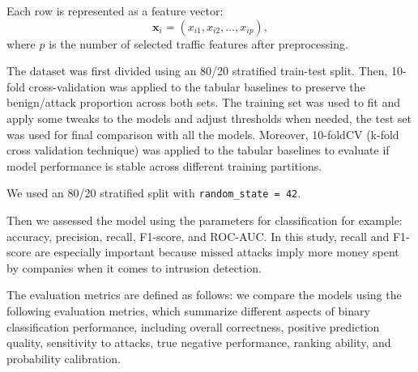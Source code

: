 \documentclass[final,5p,times,twocolumn]{elsarticle}
\begin{document}
Each row is represented as a feature vector:
\[
\mathbf{x}_i = (x_{i1}, x_{i2}, \ldots, x_{ip}),
\]
where $p$ is the number of selected traffic features after preprocessing.

The dataset was first divided using an 80/20 stratified train-test split. Then, 10-fold cross-validation was applied to the tabular baselines to preserve the benign/attack proportion across both sets. The training set was used to fit and apply some tweaks to the models and adjust thresholds when needed, the test set was used for final comparison with all the models. Moreover, 10-foldCV (k-fold cross validation technique) was applied to the tabular baselines to evaluate if model performance is stable across different training partitions.

We used an 80/20 stratified split with \texttt{random\_state = 42}.

\begin{table}[H]
\caption{Training and test split distribution.}
\centering
\small
\setlength{\tabcolsep}{4pt}
\renewcommand{\arraystretch}{1.15}
\label{tab:train_test_split_distribution}
\end{table}


Then we assessed the model using the parameters for classification for example: accuracy, precision, recall, F1-score, and ROC-AUC. In this study, recall and F1-score are especially important because missed attacks imply more money spent by companies when it comes to intrusion detection.


The evaluation metrics are defined as follows: we compare the models using the following evaluation metrics, which summarize different aspects of binary classification performance, including overall correctness, positive prediction quality, sensitivity to attacks, true negative performance, ranking ability, and probability calibration.
\end{document}
